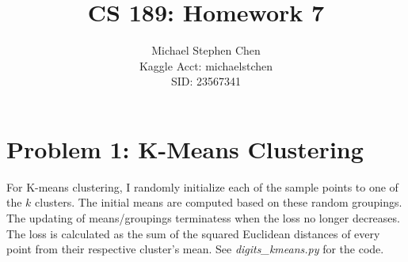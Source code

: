 \documentclass{article}
\title{CS 189: Homework 7}
\author{Michael Stephen Chen\\ Kaggle Acct: michaelstchen \\SID: 23567341}
\begin{document}
\maketitle

\pagebreak

\section*{Problem 1: K-Means Clustering}
For K-means clustering, I randomly initialize each of the sample points to one of the $k$ clusters. The initial means are computed based on these random groupings. The updating of means/groupings terminatess when the loss no longer decreases. The loss is calculated as the sum of the squared Euclidean distances of every point from their respective cluster's mean. See \textit{digits\_kmeans.py} for the code.
\end{document}
